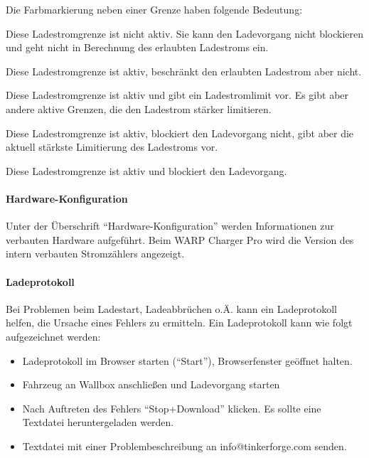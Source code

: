 \documentclass[a4paper,10pt]{article}
\begin{document}
\begin{multicols*}{2}
    Die Farbmarkierung neben einer Grenze haben folgende Bedeutung:
    \begin{description}[labelindent=0.5cm]
     \item[\textbf{\textcolor{mygray}{Grau}}] Diese Ladestromgrenze ist nicht aktiv. Sie kann den Ladevorgang nicht blockieren und geht nicht in Berechnung des erlaubten Ladestroms ein.
     \item[\textbf{\textcolor{mygreen}{Grün}}] Diese Ladestromgrenze ist aktiv, beschränkt den erlaubten Ladestrom aber nicht.
     \item[\textbf{\textcolor{myblue}{Blau}}] Diese Ladestromgrenze ist aktiv und gibt ein Ladestromlimit vor. Es gibt aber andere aktive Grenzen, die den Ladestrom stärker limitieren.
     \item[\textbf{\textcolor{myorange}{Gelb}}] Diese Ladestromgrenze ist aktiv, blockiert den Ladevorgang nicht, gibt aber die aktuell stärkste Limitierung des Ladestroms vor.
     \item[\textbf{\textcolor{myred}{Rot}}] Diese Ladestromgrenze ist aktiv und blockiert den Ladevorgang.
    \end{description}


    \paragraph{Hardware-Konfiguration}
    Unter der Überschrift \enquote{Hardware-Konfiguration} werden Informationen
    zur verbauten Hardware aufgeführt. Beim WARP Charger Pro wird die Version
    des intern verbauten Stromzählers angezeigt.

    \paragraph{Ladeprotokoll}
    Bei Problemen beim Ladestart, Ladeabbrüchen o.Ä. kann ein Ladeprotokoll
    helfen, die Ursache eines Fehlers zu ermitteln. Ein Ladeprotokoll kann
    wie folgt aufgezeichnet werden:
    \begin{itemize}
        \item Ladeprotokoll im Browser starten (\enquote{Start}), Browserfenster geöffnet halten.
        \item Fahrzeug an Wallbox anschließen und Ladevorgang starten
        \item Nach Auftreten des Fehlers \enquote{Stop+Download} klicken. Es
        sollte eine Textdatei heruntergeladen werden.
        \item Textdatei mit einer Problembeschreibung an info@tinkerforge.com
        senden.
    \end{itemize}


\end{multicols*}
\end{document}
